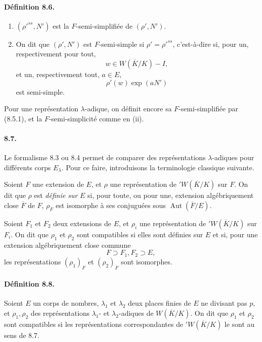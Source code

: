 \documentclass[10pt,letterpaper]{article}
\providecommand{\Aut}{\operatorname{Aut}}
\begin{document}
\paragraph{Définition 8.6.}
\begin{enumerate}[label=(\roman*)]
\item \((\rho'^{ss},N')\) est la \(F\)-semi-simplifiée de \((\rho',N')\).
\item On dit que \((\rho',N')\) est \(F\)-semi-simple si \(\rho'=\rho'^{ss}\), c'est-à-dire si, pour un, respectivement pour tout,
\[
w\in W(\overline K/K)-I,
\]
et un, respectivement tout, \(a\in E\),
\[
\rho'(w)\exp(aN')
\]
est semi-simple.
\end{enumerate}
Pour une représentation \(\lambda\)-adique, on définit encore sa \(F\)-semi-simplifiée par (8.5.1), et la \(F\)-semi-simplicité comme en (ii).

\paragraph{8.7.} Le formalisme 8.3 ou 8.4 permet de comparer des représentations \(\lambda\)-adiques pour différents corps \(E_\lambda\). Pour ce faire, introduisons la terminologie classique suivante.

Soient \(F\) une extension de \(E\), et \(\rho\) une représentation de \({}'W(\overline K/K)\) sur \(F\). On dit que \(\rho\) est \emph{définie sur} \(E\) si, pour toute, ou pour une, extension algébriquement close \(\overline F\) de \(F\), \(\rho_{\overline F}\) est isomorphe à ses conjuguées sous \(\Aut(\overline F/E)\).

Soient \(F_1\) et \(F_2\) deux extensions de \(E\), et \(\rho_i\) une représentation de \({}'W(\overline K/K)\) sur \(F_i\). On dit que \(\rho_1\) et \(\rho_2\) sont compatibles si elles sont définies sur \(E\) et si, pour une extension algébriquement close commune
\[
F\supset F_1,F_2\supset E,
\]
les représentations \((\rho_1)_F\) et \((\rho_2)_F\) sont isomorphes.

\paragraph{Définition 8.8.} Soient $E$ un corps de nombres, $\lambda_1$ et $\lambda_2$ deux places finies de $E$ ne divisant pas $p$, et $\rho_1,\rho_2$ des représentations $\lambda_1$- et $\lambda_2$-adiques de $W(\overline K/K)$. On dit que $\rho_1$ et $\rho_2$ sont compatibles si les représentations correspondantes de ${}'W(\overline K/K)$ le sont au sens de 8.7.
\end{document}
